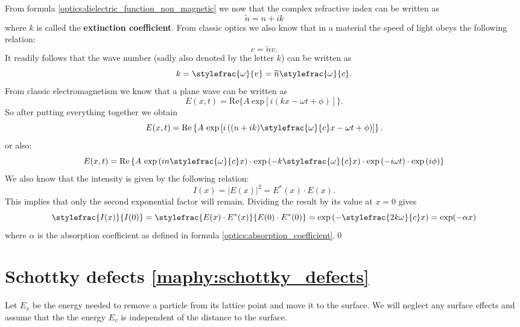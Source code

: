     From formula \ref{optics:dielectric_function_non_magnetic} we now that the complex refractive index can be written as \[\widetilde{n} = n+ik\] where $k$ is called the \textbf{extinction coefficient}. From classic optics we also know that in a material the speed of light obeys the following relation: \[c = \widetilde{n}v.\] It readily follows that the wave number (sadly also denoted by the letter $k$) can be written as \[k = \stylefrac{\omega}{v} = \widetilde{n}\stylefrac{\omega}{c}.\] From classic electromagnetism we know that a plane wave can be written as \[E(x, t) = \text{Re}\big\{A\ \text{exp}\left[i(kx - \omega t + \phi)\right]\big\}.\] So after putting everything together we obtain \[E(x, t) = \text{Re}\left\{A\ \text{exp}\left[i\left((n+ik)\stylefrac{\omega}{c}x - \omega t + \phi\right)\right]\right\}.\] or also:\[E(x, t) = \text{Re}\left\{A\ \text{exp}\left(in\stylefrac{\omega}{c}x\right)\cdot\text{exp}\left(-k\stylefrac{\omega}{c}x\right)\cdot\text{exp}\left(-i\omega t\right)\cdot\text{exp}\left(i\phi\right)\right\}\] We also know that the intensity is given by the following relation:\[I(x) = |E(x)|^2 = E^*(x)\cdot E(x).\]
    This implies that only the second exponential factor will remain. Dividing the result by its value at $x=0$ gives \[\stylefrac{I(x)}{I(0)} = \stylefrac{E(x)\cdot E^*(x)}{E(0)\cdot E^*(0)} = \text{exp}\left(-\stylefrac{2k\omega}{c}x\right) = \text{exp}(-\alpha x)\]
    where $\alpha$ is the absorption coefficient as defined in formula \ref{optics:absorption_coefficient}.\qed

\section{Schottky defects \ref{maphy:schottky_defects}}\label{deriv:schottky_defects}

    Let $E_v$ be the energy needed to remove a particle from its lattice point and move it to the surface. We will neglect any surface effects and assume that the the energy $E_v$ is independent of the distance to the surface.

